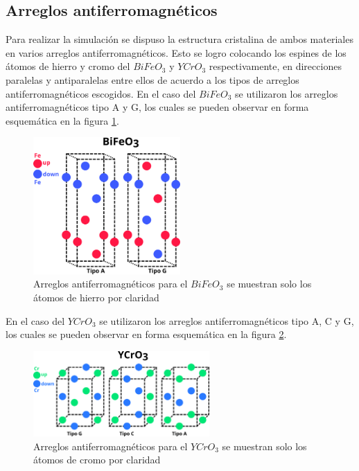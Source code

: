 \subsection{Arreglos antiferromagn\'eticos}

Para realizar la simulaci\'on se dispuso la estructura cristalina de ambos 
materiales en varios arreglos antiferromagn\'eticos. Esto se logro colocando 
los espines de los \'atomos de hierro y cromo del $BiFeO_{3}$ y $YCrO_{3}$ 
respectivamente, en direcciones paralelas y antiparalelas entre ellos de 
acuerdo a los tipos de arreglos antiferromagn\'eticos escogidos. 
En el caso del $BiFeO_{3}$ se utilizaron los arreglos antiferromagn\'eticos 
tipo A y G, los cuales se pueden observar en forma esquem\'atica en la figura 
\ref{arreglos_BFO}.

\begin{figure}[H]
    \centering
    \includegraphics[width=0.5\textwidth]{contenido/marco_teorico/metodologia/img_metodologia/BFO_unido.png}
    \caption[Arreglos antiferromagn\'eticos $BiFeO_{3}$]{Arreglos 
        antiferromagn\'eticos para el $BiFeO_{3}$ se muestran solo los \'atomos 
        de hierro por claridad}
    \label{arreglos_BFO}
\end{figure}

\noindent En el caso del $YCrO_{3}$ se utilizaron los arreglos 
antiferromagn\'eticos tipo 
A, C y G, los cuales se pueden observar en forma esquem\'atica en la figura 
\ref{arreglos_YCO}.

\begin{figure}[H]
    \centering
    \includegraphics[width=0.6\textwidth]{contenido/marco_teorico/metodologia/img_metodologia/YCO_unido.png}
    \caption[Arreglos antiferromagn\'eticos $BiFeO_{3}$]{Arreglos 
        antiferromagn\'eticos para el $YCrO_{3}$ se muestran solo los \'atomos 
        de cromo por claridad}
    \label{arreglos_YCO}
\end{figure}